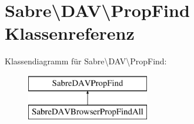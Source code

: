 \hypertarget{class_sabre_1_1_d_a_v_1_1_prop_find}{}\section{Sabre\textbackslash{}D\+AV\textbackslash{}Prop\+Find Klassenreferenz}
\label{class_sabre_1_1_d_a_v_1_1_prop_find}
Klassendiagramm für Sabre\textbackslash{}D\+AV\textbackslash{}Prop\+Find\+:\begin{figure}[H]
\begin{center}
\leavevmode
\includegraphics[height=2.000000cm]{class_sabre_1_1_d_a_v_1_1_prop_find}
\end{center}
\end{figure}
